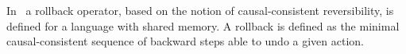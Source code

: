\documentclass[a4paper,oneside]{article}
\begin{document}
In~\cite{DBLP:journals/jlp/GiachinoLMT17} a rollback operator, 
 based on the notion of causal-consistent reversibility, is defined for a language with shared memory. 
  A rollback is  defined as the minimal causal-consistent sequence of backward steps able to undo a given action. 

\end{document}
